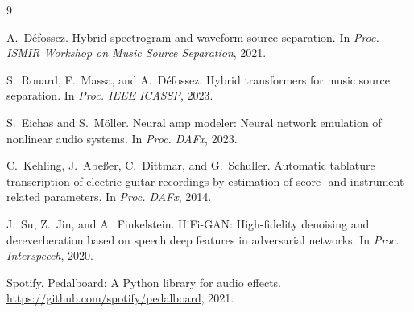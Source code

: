 \documentclass[11pt,twocolumn]{article}
\begin{document}

\begin{thebibliography}{9}

A.~D{\'e}fossez.
\newblock Hybrid spectrogram and waveform source separation.
\newblock In \emph{Proc. ISMIR Workshop on Music Source Separation}, 2021.

S.~Rouard, F.~Massa, and A.~D{\'e}fossez.
\newblock Hybrid transformers for music source separation.
\newblock In \emph{Proc. IEEE ICASSP}, 2023.

S.~Eichas and S.~M{\"o}ller.
\newblock Neural amp modeler: Neural network emulation of nonlinear audio systems.
\newblock In \emph{Proc. DAFx}, 2023.

C.~Kehling, J.~Abeßer, C.~Dittmar, and G.~Schuller.
\newblock Automatic tablature transcription of electric guitar recordings by estimation of score- and instrument-related parameters.
\newblock In \emph{Proc. DAFx}, 2014.

J.~Su, Z.~Jin, and A.~Finkelstein.
\newblock HiFi-GAN: High-fidelity denoising and dereverberation based on speech deep features in adversarial networks.
\newblock In \emph{Proc. Interspeech}, 2020.

Spotify.
\newblock Pedalboard: A Python library for audio effects.
\newblock \url{https://github.com/spotify/pedalboard}, 2021.

\end{thebibliography}
\end{document}
